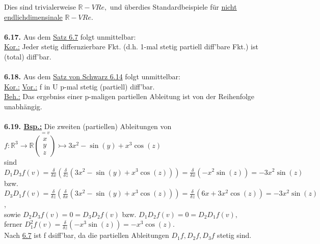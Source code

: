 \documentclass[]{scrartcl}
\begin{document}
Dies sind trivialerweise $\mathbb{R}-VRe,$ und überdies Standardbeispiele für 
\underline{nicht endlichdimensinale} $\mathbb{R}-VRe$.\\
\\
\textbf{6.17.} Aus dem \ul{Satz 6.7} folgt unmittelbar:\\
\underline{Kor.:} Jeder stetig differnzierbare Fkt. (d.h. 1-mal stetig partiell 
diff'bare Fkt.) ist (total) diff'bar.\\
\\
\textbf{6.18.} Aus dem \ul{Satz von Schwarz 6.14} folgt unmittelbar:\\
\underline{Kor.:} \underline{Vor.:} f in U p-mal stetig (partiell) diff'bar.\\
\underline{Beh.:} Das ergebniss einer p-maligen partiellen Ableitung ist von 
der Reihenfolge unabhängig.\\
\\
\textbf{6.19. \underline{Bsp.:}} Die zweiten (partiellen) Ableitungen von 
$f:\mathbb{R}^3\rightarrow\mathbb{R}\overset{=v}{\begin{pmatrix}
		x\\y\\z
\end{pmatrix}}\rightarrowtail3x^2-\sin(y)+x^3\cos(z)$\\
sind $D_1D_3f(v)=\frac{\delta}{\delta x}(\frac{\delta}{\delta 
z}(3x^2-\sin(y)+x^3 \cos(z)))=\frac{\delta}{\delta x} (-x^2 
\sin(z))=-3x^2\sin(z)$\\
bzw.$D_3D_1f(v)=\frac{\delta}{\delta z}(\frac{\delta}{\delta 
x}(3x^2-\sin(y)+x^3 \cos(z)))=\frac{\delta}{\delta z} (6x+3x^2 
\cos(z))=-3x^2\sin(z)$,\\
sowie $D_2D_3f(v)=0=D_3D_2f(v)$ bzw. $D_1D_2f(v)=0=D_2D_1f(v),$\\
ferner $D_1^2f(v)=\frac{\delta}{\delta z}(-x^3\sin(z))=-x^3\cos(z).$\\
Nach \ul{6.7} ist f dsiff'bar, da die partiellen Ableitungen $D_1f,D_2f,D_3f$ 
stetig sind.
\end{document}
